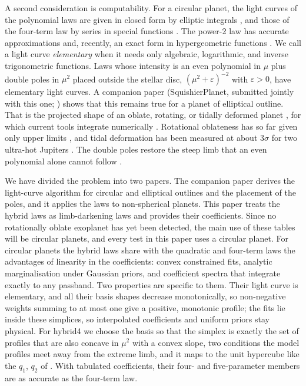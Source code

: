 \documentclass{aa}
\begin{document}
A second consideration is computability. For a circular planet, the light
curves of the polynomial laws are given in closed form by elliptic integrals
\citep{mandelagol2002,agol2020}, and those of the four-term law by series in
special functions \citep{mandelagol2002}. The power-2 law has accurate
approximations \citep{maxtedgill2019} and, recently, an exact form in
hypergeometric functions \citep{chishtie2025}. We call a light curve
\emph{elementary} when it needs only algebraic, logarithmic, and inverse
trigonometric functions. Laws whose intensity is an even polynomial in $\mu$
plus double poles in $\mu^2$ placed outside the stellar disc,
$(\mu^2+\varepsilon)^{-2}$ with $\varepsilon>0$, have elementary light curves.
A companion paper (SquishierPlanet, submitted jointly with this one;
\citealt{squishier}) shows that this remains true for a planet of elliptical
outline. That is the projected shape of an oblate, rotating, or tidally
deformed planet \citep{seagerhui2002,barnesfortney2003,carterwinn2010,zhu2014,akinsanmi2020},
for which current tools integrate numerically
\citep{cassese2024,liu2025}. Rotational oblateness has so far given only upper
limits \citep{zhu2014,liu2025}, and tidal deformation has been measured at
about $3\sigma$ for two ultra-hot Jupiters
\citep{barros2022,akinsanmi2024}. The double poles restore the steep limb that an
even polynomial alone cannot follow \citep{squishier}.

We have divided the problem into two papers. The companion paper derives the
light-curve algorithm for circular and elliptical outlines and the placement
of the poles, and it applies the laws to non-spherical planets. This paper
treats the hybrid laws as limb-darkening laws and provides their coefficients.
Since no rotationally oblate exoplanet has yet been detected, the main use of
these tables will be circular planets, and every test in this paper uses a
circular planet. For circular planets the hybrid laws share with the quadratic
and four-term laws the advantages of linearity in the coefficients: convex
constrained fits, analytic marginalisation under Gaussian priors, and
coefficient spectra that integrate exactly to any passband. Two properties are
specific to them. Their light curve is elementary, and all their basis shapes
decrease monotonically, so non-negative weights summing to at most one give a
positive, monotonic profile; the fits lie inside these simplices, so
interpolated coefficients and uniform priors stay physical. For hybrid4 we
choose the basis so that the simplex is exactly the set of profiles that are
also concave in $\mu^2$ with a convex slope, two conditions the model profiles
meet away from the extreme limb, and it maps to the unit hypercube like the
$q_1$, $q_2$ of \citet{kipping2013}. With
tabulated coefficients, their four- and five-parameter members are as accurate
as the four-term law.
\end{document}
